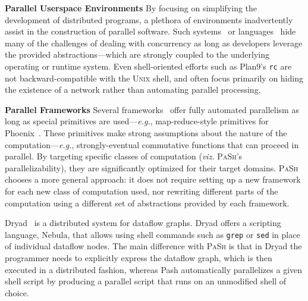 \documentclass[sigplan, review, screen, anonymous]{acmart}
\newcommand{\eg}{{\em e.g.}, }
\newcommand{\heading}[1]{\vspace{4pt}\noindent\textbf{#1}\enspace}
\newcommand{\ttt}[1]{\texttt{#1}}
\newcommand{\kk}[1]{[{\color{magenta}kk: #1}]}
\newcommand{\sys}{{\scshape PaSh}\xspace}
\newcommand{\unix}{{\scshape Unix}\xspace}
\begin{document}
\heading{Parallel Userspace Environments}
By focusing on simplifying the development of distributed programs, a plethora of environments inadvertently assist in the construction of parallel software.
Such systems~\cite{ousterhout1988sprite, mullender1990amoeba, pike1990plan9, barak1998mosix} or languages~\cite{erlang:96, acute:05, mace:07, cloudhaskell:11} hide many of the challenges of dealing with concurrency as long as developers leverage the provided abstractions---which are strongly coupled to the underlying operating or runtime system.
Even shell-oriented efforts such as Plan9's \ttt{rc} are not backward-compatible with the \unix shell, and often focus primarily on hiding the existence of a network rather than automating parallel processing.

\heading{Parallel Frameworks}
Several frameworks~\cite{streamit:02, brook:04, phoenix:11, raftlib:17} offer fully automated parallelism as long as special primitives are used---\eg map-reduce-style primitives for Phoenix~\cite{phoenix:11}.
These primitives make strong assumptions about the nature of the computation---\eg strongly-eventual commutative functions that can proceed in parallel.
By targeting specific classes of computation (\emph{viz.} \sys's parallelizability), they are significantly optimized for their target domains.
\sys chooses a more general approach:
   it does not require setting up a new framework for each new class of computation used, nor rewriting different parts of the computation using a different set of abstractions provided by each framework.


Dryad~\cite{isard2007dryad} is a distributed system for dataflow graphs. Dryad offers a scripting language, Nebula, that allows using shell commands such as \ttt{grep} or \ttt{sed} in place of individual dataflow nodes. The main difference with \sys is that in Dryad the programmer needs to explicitly express the dataflow graph, which is then executed in a distributed fashion, whereas Pash automatically parallelizes a given shell script by producing a parallel script that runs on an unmodified shell of choice.
\end{document}
